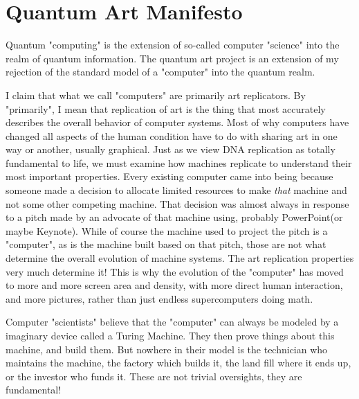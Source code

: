 \documentclass[11pt]{article}
\begin{document}
\section{
Quantum Art Manifesto}




Quantum "computing" is the extension of so-called computer "science" into the realm of quantum information.  The quantum art project is an extension of my rejection of the standard model of a "computer" into the quantum realm.




    I claim that what we call "computers" are primarily art replicators.  By "primarily", I mean that replication of art is the thing that most accurately describes the overall behavior of computer systems.  Most of why computers have changed all aspects of the human condition have to do with sharing art in one way or another, usually graphical.  Just as we view DNA replication as totally fundamental to life, we must examine how machines replicate to understand their most important properties.  Every existing computer came into being because someone made a decision to allocate limited resources to make \textit{
that} machine and not some other competing machine.  That decision was almost always in response to a pitch made by an advocate of that machine using, probably PowerPoint(or maybe Keynote).  While of course the machine used to project the pitch is a "computer", as is the machine built based on that pitch, those are not what determine the overall evolution of machine systems.  The art replication properties very much determine it!  This is why the evolution of the "computer" has moved to more and more screen area and density, with more direct human interaction, and more pictures, rather than just endless supercomputers doing math. 




    Computer "scientists" believe that the "computer" can always be modeled by a imaginary device called a Turing Machine.  They then prove things about this machine, and build them. But nowhere in their model is the technician who maintains the machine, the factory which builds it, the land fill where it ends up, or the investor who funds it.  These are not trivial oversights, they are fundamental! 
    
        
    
\end{document}
